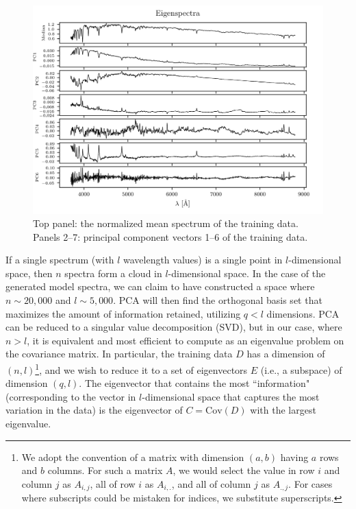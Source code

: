 \begin{figure}
    \centering
    \includegraphics[width=\textwidth]{PCs_FSPS}
    \caption[Principal component system]{\fixspacing Top panel: the normalized mean spectrum of the training data. Panels 2--7: principal component vectors 1--6 of the training data.}
    \label{fig:eigenspectra}
\end{figure}

If a single spectrum (with $l$ wavelength values) is a single point in $l$-dimensional space, then $n$ spectra form a cloud in $l$-dimensional space. In the case of the generated model spectra, we can claim to have constructed a space where $n \sim 20,000$ and $l \sim 5,000$. PCA will then find the orthogonal basis set that maximizes the amount of information retained, utilizing $q < l$ dimensions. PCA can be reduced to a singular value decomposition (SVD), but in our case, where $n > l$, it is equivalent and most efficient to compute as an eigenvalue problem on the covariance matrix. In particular, the training data $D$ has a dimension of $(n, l)$\footnote{We adopt the convention of a matrix with dimension $(a, b)$ having $a$ rows and $b$ columns. For such a matrix $A$, we would select the value in row $i$ and column $j$ as $A_{i,j}$, all of row $i$ as $A_{i,.}$, and all of column $j$ as $A_{.,j}$. For cases where subscripts could be mistaken for indices, we substitute superscripts.}, and we wish to reduce it to a set of eigenvectors $E$ (i.e., a subspace) of dimension $(q, l)$. The eigenvector that contains the most ``information" (corresponding to the vector in $l$-dimensional space that captures the most variation in the data) is the eigenvector of $C = \textrm{Cov}(D)$ with the largest eigenvalue.

